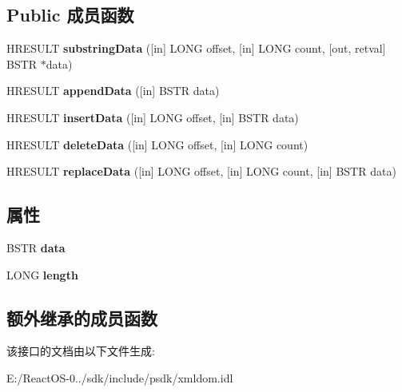 \subsection*{Public 成员函数}
\begin{DoxyCompactItemize}
\item 
\mbox{\label{interface_i_x_m_l_d_o_m_character_data_abc4058bb94034b5d47af0aea04e0bfe0}} 
H\+R\+E\+S\+U\+LT {\bfseries substring\+Data} (\mbox{[}in\mbox{]} L\+O\+NG offset, \mbox{[}in\mbox{]} L\+O\+NG count, \mbox{[}out, retval\mbox{]} B\+S\+TR $\ast$data)
\item 
\mbox{\label{interface_i_x_m_l_d_o_m_character_data_a26828953056837b493bb97103f3c48c4}} 
H\+R\+E\+S\+U\+LT {\bfseries append\+Data} (\mbox{[}in\mbox{]} B\+S\+TR data)
\item 
\mbox{\label{interface_i_x_m_l_d_o_m_character_data_aabc52573e6bd8cf445d92d86ce01e294}} 
H\+R\+E\+S\+U\+LT {\bfseries insert\+Data} (\mbox{[}in\mbox{]} L\+O\+NG offset, \mbox{[}in\mbox{]} B\+S\+TR data)
\item 
\mbox{\label{interface_i_x_m_l_d_o_m_character_data_ae140d20429a91b437c04cf2fdccce8c2}} 
H\+R\+E\+S\+U\+LT {\bfseries delete\+Data} (\mbox{[}in\mbox{]} L\+O\+NG offset, \mbox{[}in\mbox{]} L\+O\+NG count)
\item 
\mbox{\label{interface_i_x_m_l_d_o_m_character_data_ab35b4dfe4c0b194729e9f5d35b5455fb}} 
H\+R\+E\+S\+U\+LT {\bfseries replace\+Data} (\mbox{[}in\mbox{]} L\+O\+NG offset, \mbox{[}in\mbox{]} L\+O\+NG count, \mbox{[}in\mbox{]} B\+S\+TR data)
\end{DoxyCompactItemize}
\subsection*{属性}
\begin{DoxyCompactItemize}
\item 
\mbox{\label{interface_i_x_m_l_d_o_m_character_data_a17b93eff864d832d9716abca90065118}} 
B\+S\+TR {\bfseries data}
\item 
\mbox{\label{interface_i_x_m_l_d_o_m_character_data_a82f54a353113473652a9ec698e0bce56}} 
L\+O\+NG {\bfseries length}
\end{DoxyCompactItemize}
\subsection*{额外继承的成员函数}


该接口的文档由以下文件生成\+:\begin{DoxyCompactItemize}
\item 
E\+:/\+React\+O\+S-\/0../sdk/include/psdk/xmldom.\+idl\end{DoxyCompactItemize}
